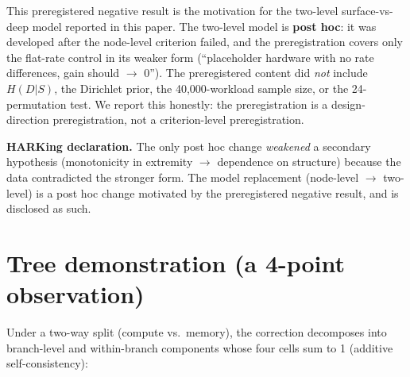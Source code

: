 \documentclass[10pt]{article}
\begin{document}
This preregistered negative result is the motivation for the two-level surface-vs-deep model reported in this paper. The two-level model is \textbf{post hoc}: it was developed after the node-level criterion failed, and the preregistration covers only the flat-rate control in its weaker form (``placeholder hardware with no rate differences, gain should $\rightarrow$ 0''). The preregistered content did \emph{not} include $H(D|S)$, the Dirichlet prior, the 40,000-workload sample size, or the 24-permutation test. We report this honestly: the preregistration is a design-direction preregistration, not a criterion-level preregistration.

\textbf{HARKing declaration.} The only post hoc change \emph{weakened} a secondary hypothesis (monotonicity in extremity $\rightarrow$ dependence on structure) because the data contradicted the stronger form. The model replacement (node-level $\rightarrow$ two-level) is a post hoc change motivated by the preregistered negative result, and is disclosed as such.

\section{Tree demonstration (a 4-point observation)}\label{tree-demonstration-a-4-point-observation}

Under a two-way split (compute vs.\ memory), the correction decomposes into branch-level and within-branch components whose four cells sum to 1 (additive self-consistency):
\end{document}
